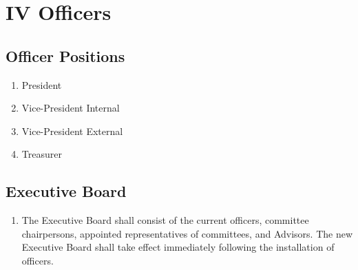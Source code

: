 \section{IV \textendash{} Officers}
  \subsection{ Officer Positions}
    \begin{enumerate}[label=\arabic*.]
      \item President
      \item Vice-President Internal
      \item Vice-President External
      \item Treasurer
    \end{enumerate}
  \subsection{Executive Board}
    \begin{enumerate}[label=\arabic*.]
      \item The Executive Board shall consist of the current officers, committee
      chairpersons, appointed representatives of committees, and Advisors. The
      new Executive Board shall take effect immediately following the
      installation of officers.
    \end{enumerate}
